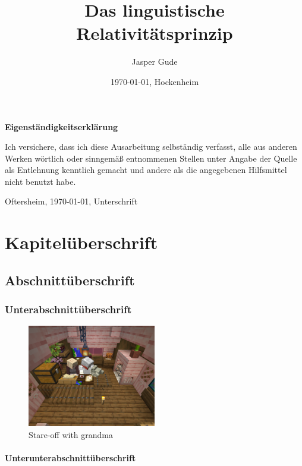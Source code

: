 \documentclass[12pt]{scrreprt}
\title{Das linguistische Relativitätsprinzip}
\author{Jasper Gude}
\date{\today{}, Hockenheim}
\begin{document}
\maketitle

\begin{center}
	\bfseries{Eigenständigkeitserklärung}
\end{center}
Ich versichere, dass ich diese Ausarbeitung selbständig verfasst, alle aus anderen Werken
wörtlich oder sinngemäß entnommenen Stellen unter Angabe der Quelle als Entlehnung
kenntlich gemacht und andere als die angegebenen Hilfsmittel nicht benutzt habe.

Oftersheim, \today, Unterschrift

\tableofcontents
\listoffigures
\listoftables

\chapter{Kapitelüberschrift}
	\label{chap:kapitel}

\section{Abschnittüberschrift}
	\label{sec:abschnitt}
\lipsum[2-4]
\autocite[5]{a}

\subsection{Unterabschnittüberschrift}
	\label{sec:unterabschnitt}
\lipsum[1-2]
\autocite[1--5]{b}

\begin{figure}[!htb]
	\centering
	  \includegraphics[width=0.5\textwidth]{image}
	\caption{Stare-off with grandma}
	\label{fig:granny}
\end{figure}

\subsubsection{Unterunterabschnittüberschrift}
	\label{sec:unterunterabschnitt}
\lipsum[1-1]
\autocite[30--58]{c}

\printbibliography
\end{document}
